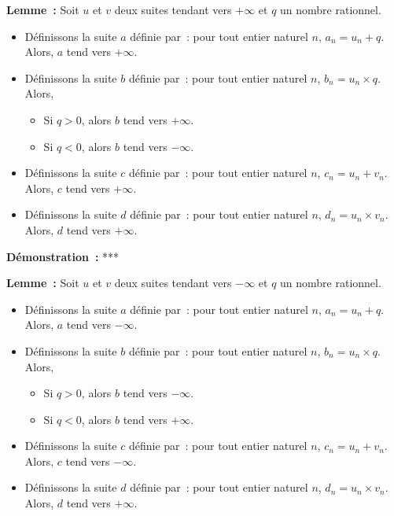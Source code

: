 \noindent\textbf{Lemme :} Soit $u$ et $v$ deux suites tendant vers $+\infty$ et $q$ un nombre rationnel.
    \begin{itemize}[nosep]
        \item Définissons la suite $a$ définie par : pour tout entier naturel $n$, $a_n = u_n + q$.
            Alors, $a$ tend vers $+\infty$.
        \item Définissons la suite $b$ définie par : pour tout entier naturel $n$, $b_n = u_n \times q$.
            Alors, 
            \begin{itemize}[nosep]
                \item Si $q > 0$, alors $b$ tend vers $+\infty$.
                \item Si $q < 0$, alors $b$ tend vers $-\infty$.
            \end{itemize}
        \item Définissons la suite $c$ définie par : pour tout entier naturel $n$, $c_n = u_n + v_n$.
            Alors, $c$ tend vers $+\infty$.
        \item Définissons la suite $d$ définie par : pour tout entier naturel $n$, $d_n = u_n \times v_n$.
            Alors, $d$ tend vers $+\infty$.
    \end{itemize}

\medskip

\noindent\textbf{Démonstration :} ***

\medskip

\noindent\textbf{Lemme :} Soit $u$ et $v$ deux suites tendant vers $-\infty$ et $q$ un nombre rationnel.
    \begin{itemize}[nosep]
        \item Définissons la suite $a$ définie par : pour tout entier naturel $n$, $a_n = u_n + q$.
            Alors, $a$ tend vers $-\infty$.
        \item Définissons la suite $b$ définie par : pour tout entier naturel $n$, $b_n = u_n \times q$.
            Alors, 
            \begin{itemize}[nosep]
                \item Si $q > 0$, alors $b$ tend vers $-\infty$.
                \item Si $q < 0$, alors $b$ tend vers $+\infty$.
            \end{itemize}
        \item Définissons la suite $c$ définie par : pour tout entier naturel $n$, $c_n = u_n + v_n$.
            Alors, $c$ tend vers $-\infty$.
        \item Définissons la suite $d$ définie par : pour tout entier naturel $n$, $d_n = u_n \times v_n$.
            Alors, $d$ tend vers $+\infty$.
    \end{itemize}

